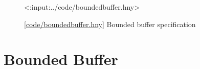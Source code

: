 \documentclass{report}
\newcommand{\harmonylink}[1]{%
[\href{https://harmony.cs.cornell.edu/#1}{\underline{#1}}]%
}
\newenvironment{code}{
\tcolorbox
}{
\endtcolorbox
}
\begin{document}
\begin{figure}
\begin{code}
<{:input:../code/boundedbuffer.hny}>
\end{code}
\caption{\harmonylink{code/boundedbuffer.hny} Bounded buffer specification}
\label{fig:boundedbuffer}
\end{figure}

\section{Bounded Buffer}
%
%
%

\end{document}
